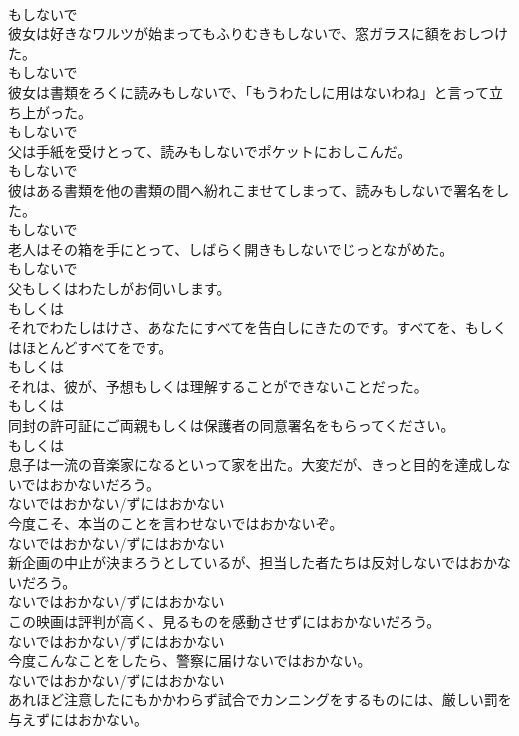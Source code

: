 \documentclass[8pt]{extreport}
\begin{document}
\begin{CJK}{UTF8}{min}
\\	もしないで
\\	彼女は好きなワルツが始まってもふりむきもしないで、窓ガラスに額をおしつけた。	
\\	もしないで
\\	彼女は書類をろくに読みもしないで、「もうわたしに用はないわね」と言って立ち上がった。	
\\	もしないで
\\	父は手紙を受けとって、読みもしないでポケットにおしこんだ。	
\\	もしないで
\\	彼はある書類を他の書類の間へ紛れこませてしまって、読みもしないで署名をした。	
\\	もしないで
\\	老人はその箱を手にとって、しばらく開きもしないでじっとながめた。	
\\	もしないで
\\	父もしくはわたしがお伺いします。	
\\	もしくは
\\	それでわたしはけさ、あなたにすべてを告白しにきたのです。すべてを、もしくはほとんどすべてをです。	
\\	もしくは
\\	それは、彼が、予想もしくは理解することができないことだった。	
\\	もしくは
\\	同封の許可証にご両親もしくは保護者の同意署名をもらってください。	
\\	もしくは
\\	息子は一流の音楽家になるといって家を出た。大変だが、きっと目的を達成しないではおかないだろう。	
\\	ないではおかない/ずにはおかない
\\	今度こそ、本当のことを言わせないではおかないぞ。	
\\	ないではおかない/ずにはおかない
\\	新企画の中止が決まろうとしているが、担当した者たちは反対しないではおかないだろう。	
\\	ないではおかない/ずにはおかない
\\	この映画は評判が高く、見るものを感動させずにはおかないだろう。	
\\	ないではおかない/ずにはおかない
\\	今度こんなことをしたら、警察に届けないではおかない。	
\\	ないではおかない/ずにはおかない
\\	あれほど注意したにもかかわらず試合でカンニングをするものには、厳しい罰を与えずにはおかない。	

\end{CJK}
\end{document}
